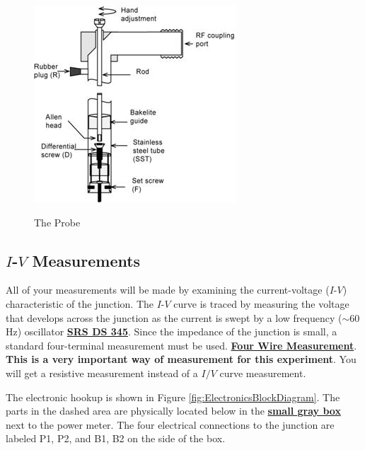 \documentclass{../lab}
\begin{document}
\begin{figure}[h]
    \centering
    \href{http://experimentationlab.berkeley.edu/sites/default/files/images/JOS6.jpg}{\includegraphics[width=0.5\linewidth]{images/JOS6.jpg}}
    \caption{The Probe}
    \label{fig:probe}
\end{figure}

\subsection{\texorpdfstring{$I$-$V$}{I-V} Measurements}

All of your measurements will be made by examining the current-voltage ($I$-$V$) characteristic of the junction. The $I$-$V$ curve is traced by measuring the voltage that develops across the junction as the current is swept by a low frequency ($\sim$60 Hz) oscillator \href{https://youtu.be/PrM8DHFOFS0}{\textbf{SRS DS 345}}. Since the impedance of the junction is small, a standard four-terminal measurement must be used. \href{http://physics111.lib.berkeley.edu/Physics111/Reprints/JOS/10-Four\_Wire\_Measurement.pdf}{\textbf{Four Wire Measurement}}. \textbf{This is a very important way of measurement for this experiment}. You will get a resistive measurement instead of a $I/V$ curve measurement.

The electronic hookup is shown in Figure \ref{fig:ElectronicsBlockDiagram}. The parts in the dashed area are physically located below in the  \href{http://experimentationlab.berkeley.edu/sites/default/files/JOS/image.jpeg}{\textbf{small gray box}} next to the power meter. The four electrical connections to the junction are labeled P1, P2, and B1, B2 on the side of the box.
\end{document}
